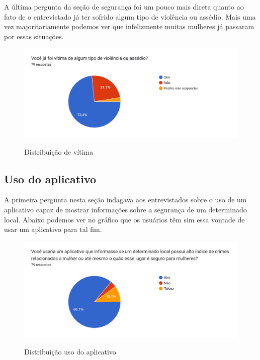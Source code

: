 A última pergunta da seção de segurança foi um pouco mais direta quanto ao fato de o entrevistado já ter sofrido algum tipo de violência ou assédio. Mais uma vez majoritariamente podemos ver que infelizmente muitas mulheres já passaram por essas situações. 
\begin{figure}[h]
  \begin{center}
  \includegraphics[width=1.0\linewidth]{images/distribuicao-vitma.png}\\
  \end{center}
  \caption[Distribuição de vítima]{Distribuição de vítima}
  \label{fig:distribuicao-vitmal}
\end{figure}
\clearpage

\subsection{Uso do aplicativo}
A primeira pergunta nesta seção indagava aos entrevistados sobre o uso de um aplicativo capaz de mostrar informações sobre a segurança de um determinado local. Abaixo podemos ver no gráfico que os usuários têm sim essa vontade de usar um aplicativo para tal fim.

\begin{figure}[h]
  \begin{center}
  \includegraphics[width=1.0\linewidth]{images/distribuicao-uso-aplicativo.png}\\
  \end{center}
  \caption[Distribuição uso do aplicativo]{Distribuição uso do aplicativo}
  \label{fig:distribuicao-uso-aplicativo}
\end{figure}

